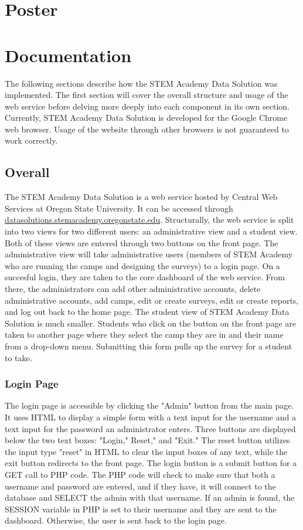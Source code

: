 \documentclass[letterpaper,10pt,serif,draftclsnofoot,onecolumn,compsoc,titlepage]{IEEEtran}
\begin{document}
\section{Poster}

\section{Documentation}
The following sections describe how the STEM Academy Data Solution was implemented.
The first section will cover the overall structure and usage of the web service before delving more deeply into each component in its own section.
Currently, STEM Academy Data Solution is developed for the Google Chrome web browser.
Usage of the website through other browsers is not guaranteed to work correctly.
\subsection{Overall}
The STEM Academy Data Solution is a web service hosted by Central Web Services at Oregon State University.
It can be accessed through \url{datasolutions.stemacademy.oregonstate.edu}.
Structurally, the web service is split into two views for two different users: an administrative view and a student view.
Both of these views are entered through two buttons on the front page.
The administrative view will take administrative users (members of STEM Academy who are running the camps and designing the surveys) to a login page.
On a succesful login, they are taken to the core dashboard of the web service.
From there, the administrators can add other administrative accounts, delete administrative accounts, add camps, edit or create surveys, edit or create reports, and log out back to the home page.
The student view of STEM Academy Data Solution is much smaller.
Students who click on the button on the front page are taken to another page where they select the camp they are in and their name from a drop-down menu.
Submitting this form pulls up the survey for a student to take.
\subsubsection{Login Page}
The login page is accessible by clicking the "Admin" button from the main page.
It uses HTML to display a simple form with a text input for the username and a text input for the password an administrator enters.
Three buttons are displayed below the two text boxes: "Login," Reset," and "Exit."
The reset button utilizes the input type "reset" in HTML to clear the input  boxes of any text, while the exit button redirects to the front page.
The login button is a submit button for a GET call to PHP code.
The PHP code will check to make sure that both a username and password are entered, and if they have, it will connect to the database and SELECT the admin with that username.
If an admin is found, the SESSION variable in PHP is set to their username and they are sent to the dashboard.
Otherwise, the user is sent back to the login page.
\end{document}

